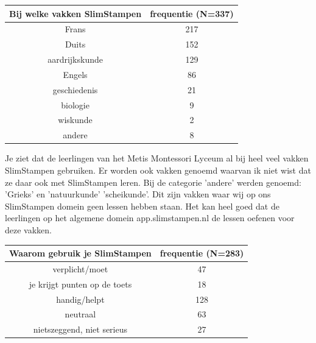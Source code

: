 \documentclass[12pt, a4paper]{article}
\begin{document}
    \begin{center}
        \begin{tabular}{|c|c|}
        \hline
             Bij welke vakken SlimStampen & frequentie (N=337) \\
         \hline
         Frans & 217 \\ 
         Duits & 152  \\ 
         aardrijkskunde & 129 \\
         Engels & 86  \\ 
         geschiedenis & 21 \\
         biologie & 9 \\
         wiskunde & 2 \\
         andere & 8 \\
         \hline
        \end{tabular}
        \end{center}
Je ziet dat de leerlingen van het Metis Montessori Lyceum al bij heel veel vakken SlimStampen gebruiken. Er worden ook vakken genoemd waarvan ik niet wist dat ze daar ook met SlimStampen leren. Bij de categorie 'andere' werden genoemd: 'Grieks' en 'natuurkunde' 'scheikunde'. Dit zijn vakken waar wij op ons SlimStampen domein geen lessen hebben staan. Het kan heel goed dat de leerlingen op het algemene domein app.slimstampen.nl de lessen oefenen voor deze vakken.

\begin{center}
    \begin{tabular}{|c|c|} 
    \hline
         Waarom gebruik je SlimStampen & frequentie (N=283) \\
     \hline
        verplicht/moet & 47 \\
        je krijgt punten op de toets & 18 \\
        handig/helpt & 128 \\
        neutraal & 63 \\
        nietszeggend, niet serieus & 27 \\
     \hline
    \end{tabular}
    \end{center}
\end{document}
